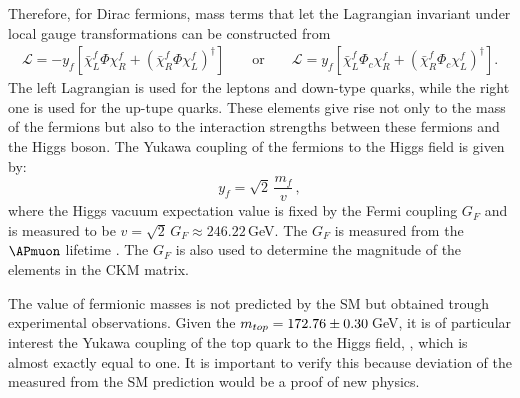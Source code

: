 Therefore, for Dirac fermions, mass terms that let the Lagrangian invariant under local gauge transformations can be constructed from
\begin{align*}%
\mathcal{L} = -y_{f}\left[\bar{\chi}_{L}^f \Phi \chi_{R}^{f} + (\bar{\chi}_{R}^f \Phi \chi_{L}^{f} )^{\dagger} \right] && \textrm{ or } && \mathcal{L} = y_{f}\left[\bar{\chi}_{L}^f \Phi_{c}\chi_{R}^{f} + (\bar{\chi}_{R}^f \Phi_{c} \chi_{L}^{f} )^{\dagger}\right] .
\end{align*}
The left Lagrangian is used for the leptons and down-type quarks, while the right one is used for the up-tupe quarks. These elements give rise not only to the mass of the fermions but also to the interaction
strengths between these fermions and the Higgs boson. The Yukawa coupling of the fermions to the Higgs field is given by:
\begin{equation}\label{eq:chap1:HiggsMechanism:YukawaCoupling}
	y_{f} = \sqrt{2} \, \frac{m_{f}}{v} \, ,
\end{equation}
where the Higgs vacuum expectation value is fixed by the Fermi coupling $G_{F}$ and is measured to be $v = \sqrt{2}\,G_{F} \approx 246.22\,$GeV. The $G_{F}$  
is measured from the $\APmuon$ lifetime \cite{MuLan:2010shf}. The $G_{F}$  is also used to determine the magnitude of the elements in the CKM matrix.

The value of fermionic masses is not predicted by the SM but obtained trough experimental observations.
Given the $m_{top} = 172.76 \pm 0.30\,$GeV, it is of particular interest the Yukawa coupling of the top quark to the Higgs field, \yt, which is almost exactly equal to one.
 It is important to verify this because deviation of the measured \yt from the SM prediction would be a proof of new physics.








